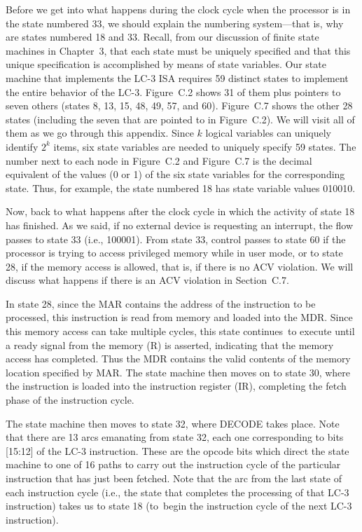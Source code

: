 \documentclass{patt}
\begin{document}
Before we get into what happens during the clock cycle when the
processor is in the state numbered 33, we should explain the numbering
system---that is, why are states numbered 18 and 33.  Recall, from our 
discussion of finite state machines in Chapter~3, that each state must be 
uniquely specified and that this unique specification is accomplished by means
of state variables.  Our state machine that implements the LC-3
ISA requires 59 distinct states to implement the entire behavior of the
LC-3.  Figure~C.2 shows 31 of them plus pointers to seven others (states 8, 13, 
15, 48, 49, 57, and 60).  Figure~C.7 shows the other 28 states (including the 
seven that are pointed to in Figure~C.2).  We will visit 
all of them as we go through this appendix.  Since $k$
logical variables can uniquely identify $2^{k}$ items, six state
variables are needed to uniquely specify 59 states.  The number next
to each node in Figure~C.2 and Figure~C.7 is the decimal equivalent of the 
values (0 or 1) of the six state variables for the corresponding state.  Thus,
for example, the state numbered 18 has state variable values 010010.

Now, back to what happens after the clock cycle in which the
activity of state 18 has finished.  As we said, if no external device is
requesting an interrupt, the flow passes to state 33 (i.e., 100001).  
From state 33, control passes to state 60 if the processor is trying to access
privileged memory while in user mode, or to state 28, if the memory access is
allowed, that is, if there is no ACV violation.  We will discuss what happens
if there is an ACV violation in Section~C.7.

In state 28, since the MAR contains the address of the instruction 
to be processed, this instruction is read from memory and loaded into the MDR.
Since this memory access can take multiple cycles, this state continues~to
execute until a ready signal from the memory (R) is asserted,
indicating that the memory access has completed.  Thus the MDR
contains the valid contents of the memory location specified by MAR.
The state machine then moves on to state 30, where the instruction is
loaded into the instruction register (IR), completing the fetch phase
of the instruction cycle.

The state machine then moves to state 32, where DECODE takes place.  Note
that there are 13 arcs emanating from state 32, each one corresponding to
bits [15:12] of the LC-3 instruction.  These are the opcode bits which direct
the state machine to one of 16 paths to carry out the instruction cycle of the
particular instruction that has just been fetched.  Note that the arc from the 
last state of each instruction cycle (i.e., the state that completes the 
processing of that LC-3 instruction) takes us to state 18 (to~begin the 
instruction cycle of the next LC-3 instruction).
\end{document}
